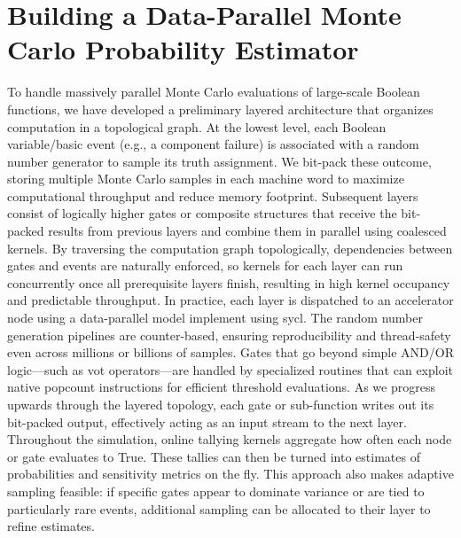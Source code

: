 \chapter{Building a Data-Parallel Monte Carlo Probability Estimator}

To handle massively parallel Monte Carlo evaluations of large-scale Boolean functions, we have developed a preliminary layered architecture that organizes computation in a topological graph. At the lowest level, each Boolean variable/basic event (e.g., a component failure) is associated with a random number generator to sample its truth assignment. We bit-pack these outcome, storing multiple Monte Carlo samples in each machine word to maximize computational throughput and reduce memory footprint. Subsequent layers consist of logically higher gates or composite structures that receive the bit-packed results from previous layers and combine them in parallel using coalesced kernels. By traversing the computation graph topologically, dependencies between gates and events are naturally enforced, so kernels for each layer can run concurrently once all prerequisite layers finish, resulting in high kernel occupancy and predictable throughput.
In practice, each layer is dispatched to an accelerator node using a data-parallel model implement using \acrshort{sycl}. The random number generation pipelines are counter-based, ensuring reproducibility and thread-safety even across millions or billions of samples. Gates that go beyond simple AND/OR logic—such as \acrshort{vot} operators—are handled by specialized routines that can exploit native popcount instructions for efficient threshold evaluations. As we progress upwards through the layered topology, each gate or sub-function writes out its bit-packed output, effectively acting as an input stream to the next layer.
Throughout the simulation, online tallying kernels aggregate how often each node or gate evaluates to True. These tallies can then be turned into estimates of probabilities and sensitivity metrics on the fly. This approach also makes adaptive sampling feasible: if specific gates appear to dominate variance or are tied to particularly rare events, additional sampling can be allocated to their layer to refine estimates.







